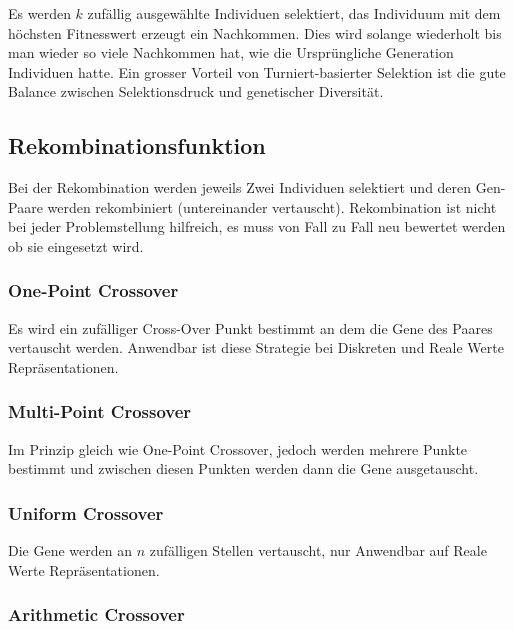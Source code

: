         Es werden \(k\) zufällig ausgewählte Individuen selektiert,
        das Individuum mit dem höchsten Fitnesswert erzeugt ein Nachkommen.
        Dies wird solange wiederholt bis man wieder so viele Nachkommen hat,
        wie die Ursprüngliche Generation Individuen hatte.
        Ein grosser Vorteil von Turniert-basierter Selektion ist die gute Balance zwischen
        Selektionsdruck und genetischer Diversität.

    \subsection{Rekombinationsfunktion}

        Bei der Rekombination werden jeweils Zwei Individuen selektiert und
        deren Gen-Paare werden rekombiniert (untereinander vertauscht).
        Rekombination ist nicht bei jeder Problemstellung hilfreich,
        es muss von Fall zu Fall neu bewertet werden ob sie eingesetzt wird.

        \subsubsection{One-Point Crossover}

          Es wird ein zufälliger Cross-Over Punkt bestimmt an dem die Gene des Paares vertauscht werden.
          Anwendbar ist diese Strategie bei Diskreten und Reale Werte Repräsentationen.

        \subsubsection{Multi-Point Crossover}

          Im Prinzip gleich wie One-Point Crossover, jedoch werden mehrere Punkte bestimmt und
          zwischen diesen Punkten werden dann die Gene ausgetauscht.

        \subsubsection{Uniform Crossover}

          Die Gene werden an \(n\) zufälligen Stellen vertauscht, nur Anwendbar auf Reale Werte Repräsentationen.

        \subsubsection{Arithmetic Crossover}

